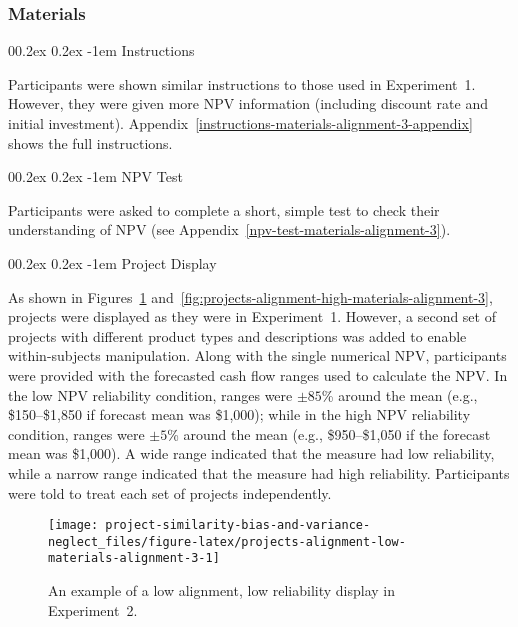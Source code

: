 \documentclass[
  english,
  man, donotrepeattitle,floatsintext]{apa7}
\makeatletter
\let\oldparagraph\paragraph
\renewcommand{\paragraph}[1]{\oldparagraph{#1}\mbox{}}
\renewcommand{\paragraph}{\@startsection{paragraph}{4}{\parindent}%
  {0\baselineskip \@plus 0.2ex \@minus 0.2ex}%
  {-1em}%
  {\normalfont\normalsize\bfseries\itshape\typesectitle}}
\theoremstyle{definition}
\theoremstyle{definition}
\theoremstyle{definition}
\theoremstyle{definition}
\theoremstyle{remark}
\makeatother
\begin{document}
\hypertarget{materials}{%
\subsubsection{Materials}\label{materials}}

\hypertarget{instructions}{%
\paragraph{Instructions}\label{instructions}}

Participants were shown similar instructions to those used in Experiment~1.
However, they were given more NPV information (including discount rate and
initial investment). Appendix~\ref{instructions-materials-alignment-3-appendix}
shows the full instructions.

\hypertarget{npv-test}{%
\paragraph{NPV Test}\label{npv-test}}

Participants were asked to complete a short, simple test to check their
understanding of NPV (see Appendix~\ref{npv-test-materials-alignment-3}).

\hypertarget{project-display}{%
\paragraph{Project Display}\label{project-display}}

As shown in Figures~\ref{fig:projects-alignment-low-materials-alignment-3}
and~\ref{fig:projects-alignment-high-materials-alignment-3}, projects were
displayed as they were in Experiment~1. However, a second set of projects with
different product types and descriptions was added to enable within-subjects
manipulation. Along with the single numerical NPV, participants were provided
with the forecasted cash flow ranges used to calculate the NPV. In the low NPV
reliability condition, ranges were \(\pm85\)\% around the mean (e.g., \$150--\$1,850
if forecast mean was \$1,000); while in the high NPV reliability condition,
ranges were \(\pm5\)\% around the mean (e.g., \$950--\$1,050 if the forecast mean was
\$1,000). A wide range indicated that the measure had low reliability, while a
narrow range indicated that the measure had high reliability. Participants were
told to treat each set of projects independently.



\begin{figure}
\texttt{[image: project-similarity-bias-and-variance-neglect\_files/figure-latex/projects-alignment-low-materials-alignment-3-1]} \caption{An example of a low alignment, low reliability display in Experiment~2.}\label{fig:projects-alignment-low-materials-alignment-3}
\end{figure}
\end{document}
